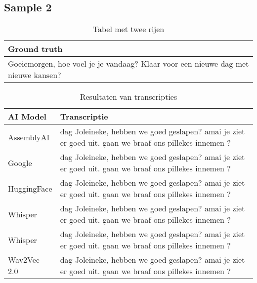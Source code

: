 \subsection{Sample 2}

\begin{table}[htbp]
    \centering
    \label{tab:groundtruth_sample2}
    \begin{tabularx}{\textwidth}{|X|}
        \hline
        \textbf{Ground truth} \\
        
        \hline
        Goeiemorgen, hoe voel je je vandaag? Klaar voor een nieuwe dag met nieuwe kansen? \\
        \hline
    \end{tabularx}
    \caption{Tabel met twee rijen}
\end{table}

\begin{table}[htbp]
    \centering
    \label{tab:results_sample2}
    \begin{tabularx}{\textwidth}{|l|X|}
        \hline
        \textbf{AI Model} & \textbf{Transcriptie} \\ \midrule
        
        AssemblyAI & dag Joleineke, hebben we goed geslapen? amai je ziet er goed uit. gaan we braaf ons pillekes innemen ? \\ \hline
        
        Google & dag Joleineke, hebben we goed geslapen? amai je ziet er goed uit. gaan we braaf ons pillekes innemen ? \\ \hline
        
        HuggingFace & dag Joleineke, hebben we goed geslapen? amai je ziet er goed uit. gaan we braaf ons pillekes innemen ? \\ \hline
        
        Whisper & dag Joleineke, hebben we goed geslapen? amai je ziet er goed uit. gaan we braaf ons pillekes innemen ? \\ \hline
        
        Whisper & dag Joleineke, hebben we goed geslapen? amai je ziet er goed uit. gaan we braaf ons pillekes innemen ? \\ \hline
        
        Wav2Vec 2.0 & dag Joleineke, hebben we goed geslapen? amai je ziet er goed uit. gaan we braaf ons pillekes innemen ? \\ \hline
    \end{tabularx}
    \caption{Resultaten van transcripties}
\end{table}
\FloatBarrier
